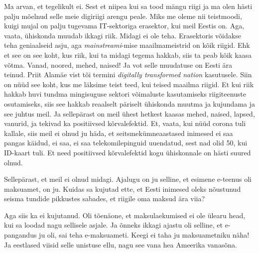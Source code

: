 
Ma arvan, et tegelikult ei. Sest et niipea kui sa tood mängu riigi ja ma olen 
hästi palju mõelnud selle meie digiriigi arengu peale. Miks me oleme nii 
teistmoodi, kuigi mujal on palju tugevama IT-sektoriga erasektor, kui meil 
Eestis on. Aga, vaata, ühiskonda muudab ikkagi riik. Midagi ei ole teha. 
Erasektoris võidakse teha geniaalseid asju, aga \emph{mainstreami}-mise 
maailmameistrid on kõik riigid. Ehk et see on see koht, kus riik, kui ta midagi 
tegema hakkab, siis ta peab kõik kaasa võtma. Vanad, noored, mehed, naised! Ja 
vot selle muudatuse on Eesti ära teinud.  Priit Alamäe vist tõi termini \emph{digitally transformed nation} kasutusele. Siin on 
nüüd see koht, kus me läksime teist teed, kui teised maailma riigid. Et kui 
riik hakkab huvi tundma mingisuguse sektori võimaluste kasutamiseks 
riigiteenuste osutamiseks, siis see hakkab reaalselt päriselt ühiskonda muutma 
ja kujundama ja see juhtus meil. Ja sellepärast on meil ühest hetkest kaasas 
mehed, naised, lapsed, vanurid,  ja tekivad ka positiivsed kõrvalefektid. Et, 
vaata, kui nüüd corona tuli kallale, siis meil ei olnud ju häda, et 
seitsmekümneaastased inimesed ei saa pangas käidud, ei saa, ei saa 
telekomilepinguid uuendatud, sest nad olid 50, kui ID-kaart tuli. Et need 
positiivsed kõrvalefektid kogu ühiskonnale on hästi suured olnud. 


Sellepärast, et meil ei olnud midagi. Ajalugu on ju selline, et esimene 
e-teenus oli maksuamet, on ju. Kuidas sa kujutad ette, et Eesti inimesed oleks 
nõustunud seisma tundide pikkustes sabades, et riigile oma maksud ära viia?


Aga siis ka ei kujutanud. Oli tõenäone, et maksulaekumised ei ole ülearu head, 
kui sa loodad nagu sellisele asjale. Ja õnneks ikkagi ajastu oli selline, et 
e-pangandus ju oli, sai teha e-maksuameti. Keegi ei taha ju maksuametniku näha! 
 Ja eestlased viisid selle unistuse ellu, nagu see vana hea Ameerika vanasõna.


